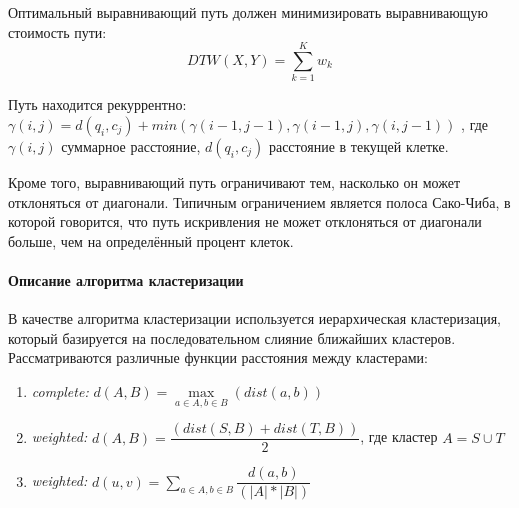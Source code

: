 \documentclass[12pt,twoside]{article}
\begin{document}
        Оптимальный выравнивающий путь должен минимизировать выравнивающую стоимость пути:
            $$
                DTW(X, Y)=\displaystyle\sum\limits_{k=1}^{K} w_k
            $$
            
        Путь находится рекуррентно:\\
            $\gamma(i, j) = d(q_i, c_j) + min({\gamma(i-1, j-1), \gamma(i-1, j), \gamma(i, j-1)})$ ,
            где $\gamma(i, j)$ суммарное расстояние, $d(q_i, c_j)$ расстояние в текущей клетке.
						
                Кроме того, выравнивающий путь ограничивают тем, насколько он может отклоняться от диагонали.
                Типичным ограничением является полоса Сако-Чиба, в которой говорится, что путь искривления не может отклоняться от диагонали больше,
                чем на определённый процент клеток.

	\paragraph{Описание алгоритма кластеризации}      
        В качестве алгоритма кластеризации используется иерархическая кластеризация, который базируется на последовательном слияние ближайших кластеров.
        Рассматриваются различные функции расстояния между кластерами: 
        \begin{enumerate}
            \item \textit{complete:}  $d(A, B) = \max\limits_{a \in A, b \in B}(dist(a, b))$ 
            \item \textit{weighted:}  $d(A,B) = \dfrac{(dist(S,B) + dist(T,B))}{2}$, где кластер $A = S \cup T$
            \item \textit{weighted:}  $d(u,v) = \sum\limits_{a \in A, b \in B} \dfrac{d(a, b)}{(|A|*|B|)}$ 
        \end{enumerate} 



\end{document}
